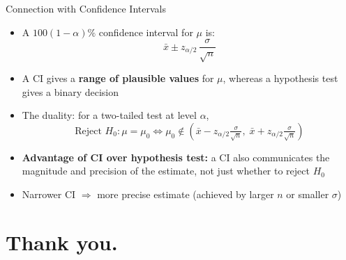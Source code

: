 \documentclass[12pt, aspectratio=169]{beamer}
\begin{document}
    \begin{frame}{Connection with Confidence Intervals}
        \begin{itemize}
            \item A $100(1-\alpha)\%$ confidence interval for $\mu$ is:
            \[
                \bar{x} \pm z_{\alpha/2}\,\frac{\sigma}{\sqrt{n}}
            \]
            \item A CI gives a \textbf{range of plausible values} for $\mu$,
                whereas a hypothesis test gives a binary decision
            \item The duality: for a two-tailed test at level $\alpha$,
            \[
                \text{Reject } H_0: \mu = \mu_0
                \iff
                \mu_0 \notin \left(\bar{x} - z_{\alpha/2}\tfrac{\sigma}{\sqrt{n}},\;
                                    \bar{x} + z_{\alpha/2}\tfrac{\sigma}{\sqrt{n}}\right)
            \]
            \item \textbf{Advantage of CI over hypothesis test:}
                a CI also communicates the magnitude and precision of the estimate,
                not just whether to reject $H_0$
            \item Narrower CI $\Rightarrow$ more precise estimate
                (achieved by larger $n$ or smaller $\sigma$)
        \end{itemize}
    \end{frame}



    \section*{Thank you.}
\end{document}
